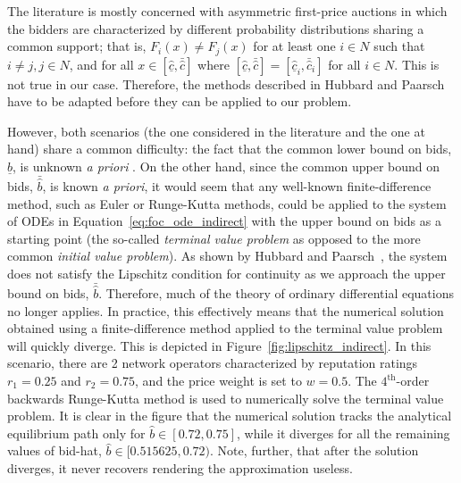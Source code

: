 The literature is mostly concerned with asymmetric first-price auctions in which the bidders are characterized by different probability distributions sharing a common support; that is, $F_i(x)\neq F_j(x)$ for at least one $i\in N$ such that $i\neq j, j\in N$, and for all $x\in [\underline{\hat{c}}, \bar{\hat{c}}]$ where $[\underline{\hat{c}}, \bar{\hat{c}}] = [\underline{\hat{c}}_i, \bar{\hat{c}}_i]$ for all $i\in N$. This is not true in our case. Therefore, the methods described in Hubbard and Paarsch~\cite{HubbardPaarsch2011} have to be adapted before they can be applied to our problem.

However, both scenarios (the one considered in the literature and the one at hand) share a common difficulty: the fact that the common lower bound on bids, $\underline{\hat{b}}$, is unknown \emph{a priori} \cite{HubbardPaarsch2011}. On the other hand, since the common upper bound on bids, $\bar{\hat{b}}$, is known \emph{a priori}, it would seem that any well-known finite-difference method, such as Euler or Runge-Kutta methods, could be applied to the system of ODEs in Equation~\eqref{eq:foc_ode_indirect} with the upper bound on bids as a starting point (the so-called \emph{terminal value problem} as opposed to the more common \emph{initial value problem}). As shown by Hubbard and Paarsch~\cite{HubbardPaarsch2011}, the system does not satisfy the Lipschitz condition for continuity as we approach the upper bound on bids, $\bar{\hat{b}}$. Therefore, much of the theory of ordinary differential equations no longer applies. In practice, this effectively means that the numerical solution obtained using a finite-difference method applied to the terminal value problem will quickly diverge. This is depicted in Figure~\ref{fig:lipschitz_indirect}. In this scenario, there are 2 network operators characterized by reputation ratings $r_1 = 0.25$ and $r_2 = 0.75$, and the price weight is set to $w=0.5$. The $4^{\text{th}}$-order backwards Runge-Kutta method is used to numerically solve the terminal value problem. It is clear in the figure that the numerical solution tracks the analytical equilibrium path only for $\hat{b}\in [0.72, 0.75]$, while it diverges for all the remaining values of bid-hat, $\hat{b}\in [0.515625, 0.72)$. Note, further, that after the solution diverges, it never recovers rendering the approximation useless.

